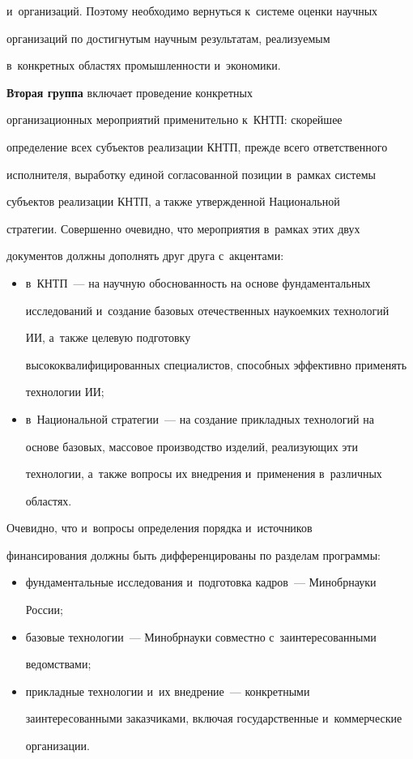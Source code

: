 и~организаций. Поэтому необходимо вернуться к~системе оценки научных 

организаций по достигнутым научным результатам, реализуемым 

в~конкретных областях промышленности и~экономики. 

    

    \textbf{Вторая группа} включает проведение конкретных 

организационных мероприятий применительно к~КНТП: скорейшее 

определение всех субъектов реализации КНТП, прежде всего ответственного 

исполнителя, выработку единой согласованной позиции в~рамках системы 

субъектов реализации КНТП, а также утвержденной Национальной 

стратегии. Совершенно очевидно, что мероприятия в~рамках этих двух 

документов должны дополнять друг друга с~акцентами: 

    \begin{itemize}

\item в~КНТП~--- на научную обоснованность на основе фундаментальных 

исследований и~создание базовых отечественных наукоемких технологий 

ИИ, а~также целевую подготовку 

высококвалифицированных специалистов, способных эффективно применять 

технологии ИИ; 

\item в~Национальной стратегии~--- на создание прикладных технологий на 

основе базовых, массовое производство изделий, реализующих эти 

технологии, а~также вопросы их внедрения и~применения в~различных 

областях. 

\end{itemize}



    Очевидно, что и~вопросы определения порядка и~источников 

финансирования должны быть дифференцированы по разделам программы:

    \begin{itemize}

\item фундаментальные исследования и~подготовка кадров~--- Минобрнауки 

России; 

\item базовые технологии~--- Минобрнауки совместно с~заинтересованными 

ведомствами; 

\item прикладные технологии и~их внедрение~--- конкретными 

заинтересованными заказчиками, включая государственные и~коммерческие 

организации. 

\end{itemize}

